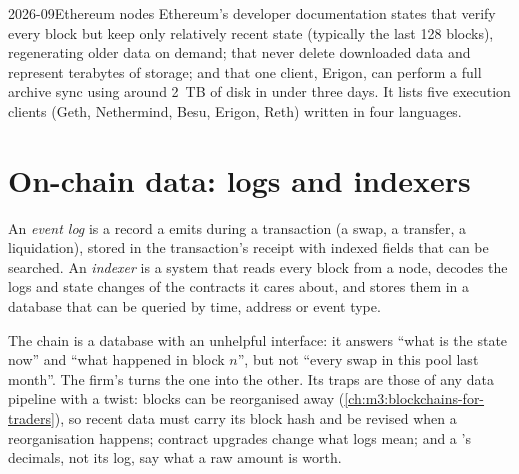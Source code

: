 \begin{dated}{2026-09}{Ethereum nodes}\label{dat:m3:crypto-data-and-infrastructure:nodes}
Ethereum's developer documentation states that  verify every block but keep only relatively recent state (typically the
last 128 blocks), regenerating older data on demand; that  never delete downloaded data and represent terabytes of
storage; and that one client, Erigon, can perform a full archive sync using around 2~TB of disk in under three days. It lists five
execution clients (Geth, Nethermind, Besu, Erigon, Reth) written in four languages.
\end{dated}

\section{On-chain data: logs and indexers}

\begin{definition}\label{def:m3:crypto-data-and-infrastructure:log}
An \emph{event log} is a record a  emits during a transaction (a swap, a transfer, a liquidation),
stored in the transaction's receipt with indexed fields that can be searched. An \emph{indexer} is a system that reads
every block from a node, decodes the logs and state changes of the contracts it cares about, and stores them in a database that can
be queried by time, address or event type.
\end{definition}

The chain is a database with an unhelpful interface: it answers ``what is the state now'' and ``what happened in block $n$'', but not
``every swap in this pool last month''. The firm's  turns the one into the other. Its traps are those of any data pipeline with
a twist: blocks can be reorganised away (\cref{ch:m3:blockchains-for-traders}), so recent data must carry its block hash and be revised
when a reorganisation happens; contract upgrades change what logs mean; and a 's decimals, not its log, say what a raw amount is
worth.

